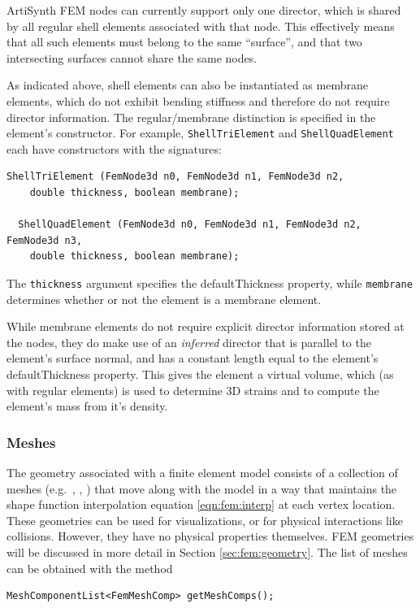 \begin{sideblock}
ArtiSynth FEM nodes can currently support only one director, which
is shared by all regular shell elements associated with that
node. This effectively means that all such elements must belong to the
same ``surface'', and that two intersecting surfaces cannot share the
same nodes.
\end{sideblock}

As indicated above, shell elements can also be instantiated as
membrane elements, which do not exhibit bending stiffness and
therefore do not require director information. The regular/membrane
distinction is specified in the element's constructor.  For example,
{\tt ShellTriElement} and {\tt ShellQuadElement} each have
constructors with the signatures:
%
\begin{lstlisting}[]
  ShellTriElement (FemNode3d n0, FemNode3d n1, FemNode3d n2,
    double thickness, boolean membrane);

  ShellQuadElement (FemNode3d n0, FemNode3d n1, FemNode3d n2, FemNode3d n3,
    double thickness, boolean membrane);
\end{lstlisting}
%
The {\tt thickness} argument specifies the {\sf defaultThickness}
property, while {\tt membrane} determines whether or not the
element is a membrane element.

While membrane elements do not require explicit director information
stored at the nodes, they do make use of an {\it inferred} director
that is parallel to the element's surface normal, and has a constant
length equal to the element's {\sf defaultThickness} property. This
gives the element a virtual volume, which (as with regular elements)
is used to determine 3D strains and to compute the element's mass from
it's density.

\subsubsection{Meshes}
\ifLaTeXML{\newline}

The geometry associated with a finite element model consists of a collection
of meshes (e.g.~, ,
) that move along with the
model in a way that maintains the shape function interpolation equation 
\eqref{eqn:fem:interp}
at each vertex location.  These geometries can be used for visualizations, or 
for physical interactions like collisions.  However, they have no physical 
properties themselves. FEM geometries will be discussed in more detail in 
Section \ref{sec:fem:geometry}.  The list of meshes can be obtained with the 
method
\begin{lstlisting}[]
  MeshComponentList<FemMeshComp> getMeshComps();
\end{lstlisting}

